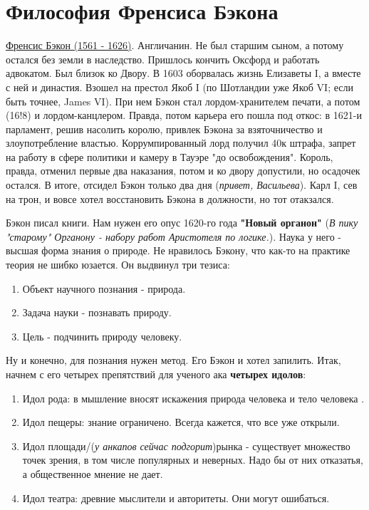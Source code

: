 \section{Философия Френсиса Бэкона}
\underline{Френсис Бэкон (1561 - 1626)}. Англичанин. Не был старшим сыном, а потому остался без земли в наследство. Пришлось кончить Оксфорд и работать адвокатом. Был близок ко Двору. В 1603 оборвалась жизнь Елизаветы I, а вместе с ней и династия. Взошел на престол Якоб I (по Шотландии уже Якоб VI; если быть точнее, James VI). При нем Бэкон стал лордом-хранителем печати, а потом (16!8) и лордом-канцлером. Правда, потом карьера его пошла под откос: в 1621-и парламент, решив насолить королю, привлек Бэкона за взяточничество и злоупотребление властью. Коррумпированный лорд получил 40к штрафа, запрет на работу в сфере политики и камеру в Тауэре "до освобождения". Король, правда, отменил первые два наказания, потом и ко двору допустили, но осадочек остался. В итоге, отсидел Бэкон только два дня (\textit{привет, Васильева}). Карл I, сев на трон, и вовсе хотел восстановить Бэкона в должности, но тот отакзался.

Бэкон писал книги. Нам нужен его опус 1620-го года \textbf{"Новый органон"} (\textit{В пику "старому" Органону - набору работ Аристотеля по логике.}). Наука у него - высшая форма знания о природе.
Не нравилось Бэкону, что как-то на практике теория не шибко юзается.  Он выдвинул три тезиса:
\begin{enumerate}
\item Объект научного познания - природа.
\item Задача науки - познавать природу.
\item Цель - подчинить природу человеку.
\end{enumerate}
Ну и конечно, для познания нужен метод. Его Бэкон и хотел запилить. Итак, начнем с его четырех препятствий для ученого ака \textbf{четырех идолов}:
\begin{enumerate}
\item Идол рода: в мышление вносят искажения природа человека и тело человека . 
\item Идол пещеры: знание ограничено. Всегда кажется, что все уже открыли.
\item Идол площади/(\textit{у анкапов сейчас подгорит})рынка - существует множество точек зрения, в том числе популярных и неверных. Надо бы  от них отказатья, а общественное мнение не дает.
\item Идол театра: древние мыслители и авторитеты. Они могут ошибаться.
\end{enumerate}

